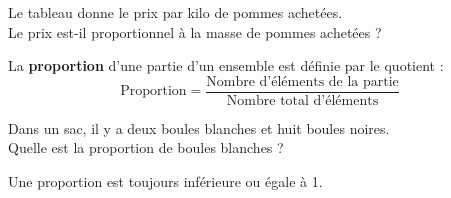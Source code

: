 \begin{Exemple}
Le tableau donne le prix par kilo de pommes achetées. \\
Le prix est-il proportionnel à la masse de pommes achetées ?
\begin{center}
\end{center}

\ligne

\ligne

\ligne

 
\end{Exemple}

\begin{Définition}[c]
La \textbf{proportion} d'une partie d'un ensemble est définie par le quotient :
$$\text{Proportion} = \dfrac{\text{Nombre d'éléments de la partie}}{\text{Nombre total d'éléments}}$$
\end{Définition}

\begin{Exemple}
Dans un sac, il y a deux boules blanches et huit boules noires. \\
Quelle est la proportion de boules blanches ?

\ligne



\end{Exemple}

\begin{Remarque}
Une proportion est toujours inférieure ou égale à 1.
\end{Remarque}

